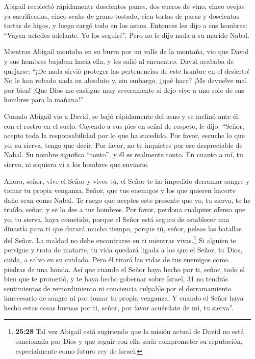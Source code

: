  Abigail recolectó rápidamente doscientos panes, dos cueros
de vino, cinco ovejas ya sacrificadas, cinco seahs de grano tostado,
cien tortas de pasas y doscientas tortas de higos, y luego cargó todo en
los asnos.  Entonces les dijo a sus hombres: ``Vayan
ustedes adelante. Yo los seguiré''. Pero no le dijo nada a su marido
Nabal.

 Mientras Abigail montaba en su burro por un valle de la
montaña, vio que David y sus hombres bajaban hacia ella, y les salió al
encuentro.  David acababa de quejarse: ``¡De nada sirvió
proteger las pertenencias de este hombre en el desierto! No le han
robado nada en absoluto y, sin embargo, ¿qué hace? ¡Me devuelve mal por
bien!  ¡Que Dios me castigue muy severamente si dejo vivo a
uno solo de sus hombres para la mañana!''

 Cuando Abigail vio a David, se bajó rápidamente del asno y
se inclinó ante él, con el rostro en el suelo.  Cayendo a
sus pies en señal de respeto, le dijo: ``Señor, acepto toda la
responsabilidad por lo que ha sucedido. Por favor, escuche lo que yo, su
sierva, tengo que decir.  Por favor, no te inquietes por
ese despreciable de Nabal. Su nombre significa ``tonto'', y él es
realmente tonto. En cuanto a mí, tu siervo, ni siquiera vi a los hombres
que enviaste.

 Ahora, señor, vive el Señor y vives tú, el Señor te ha
impedido derramar sangre y tomar tu propia venganza. Señor, que tus
enemigos y los que quieren hacerte daño sean como Nabal. 
Te ruego que aceptes este presente que yo, tu sierva, te he traído,
señor, y se lo des a tus hombres.  Por favor, perdona
cualquier ofensa que yo, tu sierva, haya cometido, porque el Señor está
seguro de establecer una dinastía para ti que durará mucho tiempo,
porque tú, señor, peleas las batallas del Señor. La maldad no debe
encontrarse en ti mientras vivas.\footnote{\textbf{25:28} Tal vez
  Abigail está sugiriendo que la misión actual de David no está
  sancionada por Dios y que seguir con ella sería comprometer su
  reputación, especialmente como futuro rey de Israel.}  Si
alguien te persigue y trata de matarte, tu vida quedará ligada a los que
el Señor, tu Dios, cuida, a salvo en su cuidado. Pero él tirará las
vidas de tus enemigos como piedras de una honda.  Así que
cuando el Señor haya hecho por ti, señor, todo el bien que te prometió,
y te haya hecho gobernar sobre Israel, 31 no tendrás sentimientos de
remordimiento ni conciencia culpable por el derramamiento innecesario de
sangre ni por tomar tu propia venganza. Y cuando el Señor haya hecho
estas cosas buenas por ti, señor, por favor acuérdate de mí, tu
sierva''.

